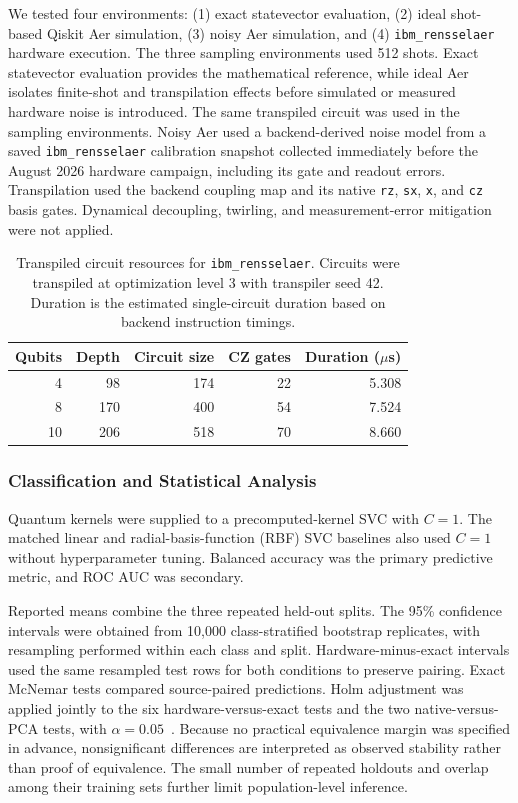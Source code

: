 \documentclass[letterpaper]{article} %
\begin{document}
We tested four environments: (1) exact statevector evaluation, (2) ideal shot-based Qiskit Aer simulation, (3) noisy Aer simulation, and (4) \texttt{ibm\_rensselaer} hardware execution. The three sampling environments used 512 shots. Exact statevector evaluation provides the mathematical reference, while ideal Aer isolates finite-shot and transpilation effects before simulated or measured hardware noise is introduced. The same transpiled circuit was used in the sampling environments. Noisy Aer used a backend-derived noise model from a saved \texttt{ibm\_rensselaer} calibration snapshot collected immediately before the August 2026 hardware campaign, including its gate and readout errors. Transpilation used the backend coupling map and its native \texttt{rz}, \texttt{sx}, \texttt{x}, and \texttt{cz} basis gates. Dynamical decoupling, twirling, and measurement-error mitigation were not applied.



\begin{table}[t]
  \centering
  \small
  \caption{Transpiled circuit resources for \texttt{ibm\_rensselaer}.
  Circuits were transpiled at optimization level 3 with transpiler
  seed 42. Duration is the estimated single-circuit duration based on backend instruction timings.}
  \label{tab:circuit-resources}
  \begin{tabular}{rrrrr}
  \toprule
  Qubits & Depth & Circuit size & CZ gates & Duration ($\mu$s) \\
  \midrule
  4  & 98  & 174 & 22 & 5.308 \\
  8  & 170 & 400 & 54 & 7.524 \\
  10 & 206 & 518 & 70 & 8.660 \\
  \bottomrule
  \end{tabular}
  \end{table}

\subsubsection{Classification and Statistical Analysis}

Quantum kernels were supplied to a precomputed-kernel SVC with $C=1$. The matched linear and radial-basis-function (RBF) SVC baselines also used $C=1$ without hyperparameter tuning. Balanced accuracy was the primary predictive metric, and ROC AUC was secondary.

Reported means combine the three repeated held-out splits. The 95\% confidence intervals were obtained from 10,000 class-stratified bootstrap replicates, with resampling performed within each class and split. Hardware-minus-exact intervals used the same resampled test rows for both conditions to preserve pairing. Exact McNemar tests compared source-paired predictions. Holm adjustment was applied jointly to the six hardware-versus-exact tests and the two native-versus-PCA tests, with $\alpha=0.05$~\cite{mcnemar1947,holm1979}. Because no practical equivalence margin was specified in advance, nonsignificant differences are interpreted as observed stability rather than proof of equivalence. The small number of repeated holdouts and overlap among their training sets further limit population-level inference.
\end{document}
